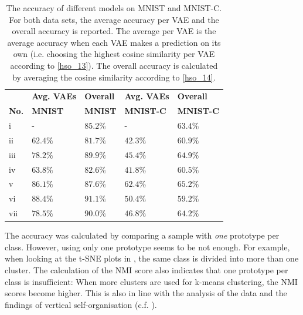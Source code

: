 \begin{table}[h] 
    \centering
	 \begin{tabular}{l l l l l}
	 	& \textbf{Avg. VAEs} & \textbf{Overall} & \textbf{Avg. VAEs} & \textbf{Overall}\\
    	\textbf{No.} & \textbf{MNIST} & \textbf{MNIST} & \textbf{MNIST-C} & \textbf{MNIST-C}\\
        \hline
		i & - & $85.2\%$ & - & $63.4\%$ \\
		ii & $62.4\%$ & $81.7\%$ & $42.3\%$ & $60.9\%$ \\
		iii & $78.2\%$ & $89.9\%$ & $45.4\%$ & $64.9\%$ \\
		iv & $63.8\%$ & $82.6\%$ & $41.8\%$ & $60.5\%$  \\
		v & $86.1\%$ & $87.6\%$ & $62.4\%$ & $65.2\%$ \\
		vi & $88.4\%$ & $91.1\%$ & $50.4\%$ & $59.2\%$ \\
		vii & $78.5\%$ & $90.0\%$ & $46.8\%$ & $64.2\%$ \\
    \end{tabular}
    \caption[Accuracy of different architectures on MNIST and MNIST-C]{The accuracy of different models on MNIST and MNIST-C. For both data sets, the average accuracy per VAE and the overall accuracy is reported. The average per VAE is the average accuracy when each VAE makes a prediction on its own (i.e. choosing the highest cosine similarity per VAE according to \eqref{hso_13}). The overall accuracy is calculated by averaging the cosine similarity according to \eqref{hso_14}.}
\end{table}

The accuracy was calculated by comparing a sample with \emph{one} prototype per class. However, using only one prototype seems to be not enough. For example, when looking at the t-SNE plots in , the same class is divided into more than one cluster. The calculation of the NMI score also indicates that one prototype per class is insufficient: When more clusters are used for k-means clustering, the NMI scores become higher. This is also in line with the analysis of the data and the findings of vertical self-organisation (c.f. ).









